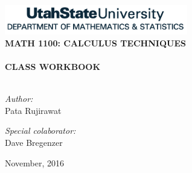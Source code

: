 \begin{titlepage}
\vbox{ }

\vbox{ }

\begin{center}
\begin{figure}[h]%
    \centering
   \hspace{5cm}
    
    \label{fig:logos}%
\end{figure}

\includegraphics[width=0.6\textwidth]{./images/mathStatLogo.png}\\[1cm]

\vspace{0.5in}
\textsc{\LARGE \bfseries MATH 1100: CALCULUS TECHNIQUES }\\[1.5cm]

\vbox{ }
\HRule \\[0.4cm]
{ \huge \bfseries CLASS WORKBOOK }\\[0.4cm]
\HRule \\[1.5cm]
\begin{minipage}{0.4\textwidth}
\begin{flushleft} \large
\emph{Author:}\\
Pata Rujirawat
\end{flushleft}
\end{minipage}
\begin{minipage}{0.4\textwidth}
\begin{flushright} \large
\emph{Special colaborator:} \\
Dave Bregenzer
\end{flushright}
\end{minipage}
\vfill
{\large November, 2016}
\end{center}
\end{titlepage}